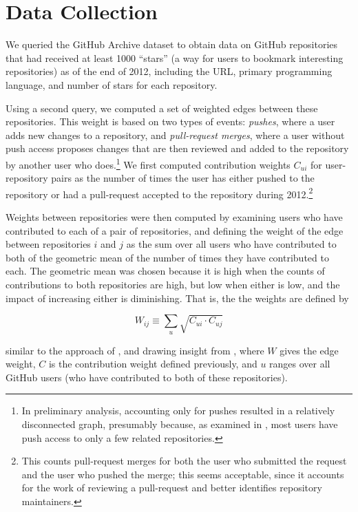 \documentclass[twocolumn]{article}
\begin{document}
\section{Data Collection}
We queried the GitHub Archive dataset\cite{githubarchive} to obtain data on
GitHub repositories that had received at least 1000 ``stars'' (a way for users
to bookmark interesting repositories) as of the end of 2012, including the URL,
primary programming language, and number of stars for each repository.

Using a second query, we computed a set of weighted edges between these
repositories. This weight is based on two types of events: \emph{pushes}, where
a user adds new changes to a repository, and \emph{pull-request merges}, where a
user without push access proposes changes that are then reviewed and added to
the repository by another user who does.\footnote{In preliminary analysis,
accounting only for pushes resulted in a relatively disconnected graph,
presumably because, as examined in \cite{khadke}, most users have push access to only a few related
repositories.} We first computed contribution weights $C_{ui}$ for
user-repository pairs as the number of times the user has either pushed to the
repository or had a pull-request accepted to the repository during
2012.\footnote{This counts pull-request merges for both the user who submitted
the request and the user who pushed the merge; this seems acceptable, since it
accounts for the work of reviewing a pull-request and better identifies
repository maintainers.}

Weights between repositories were then computed by examining users who have
contributed to each of a pair of repositories, and defining the weight of the
edge between repositories $i$ and $j$ as the sum over all users who have
contributed to both of the geometric mean of the number of times they have
contributed to each. The geometric mean was chosen because it is high when the
counts of contributions to both repositories are high, but low when either is
low, and the impact of increasing either is diminishing. That is, the the
weights are defined by

\begin{equation}
    W_{ij} \equiv \sum_u \sqrt{C_{ui} \cdot C_{uj}}
\end{equation}

similar to the approach of \cite{marrama}, and drawing insight from
\cite{opsahlproj,opsahl11}, where $W$ gives the edge weight, $C$ is the
contribution weight defined previously, and $u$ ranges over all GitHub users
(who have contributed to both of these repositories).
\end{document}
